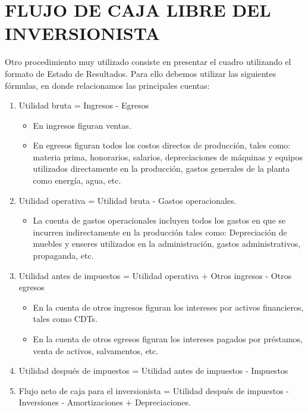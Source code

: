 


\section{FLUJO DE CAJA LIBRE DEL INVERSIONISTA}

Otro procedimiento muy utilizado consiste en presentar el cuadro utilizando el formato de Estado de Resultados. Para ello debemos utilizar las siguientes fórmulas, en donde relacionamos las principales cuentas:\\

\begin{enumerate}
	\item Utilidad bruta = Ingresos - Egresos
	      \begin{itemize}
		      \item En ingresos figuran ventas.
		      \item En egresos figuran todos los costos directos de producción, tales como: materia prima, honorarios, salarios, depreciaciones de máquinas y equipos utilizados directamente en la producción, gastos generales de la planta como energía, agua, etc.\\
	      \end{itemize}
	\item Utilidad operativa = Utilidad bruta - Gastos operacionales.
	      \begin{itemize}
		      \item La cuenta de gastos operacionales incluyen todos los gastos en que se incurren indirectamente en la producción tales como: Depreciación de muebles y enseres utilizados en la administración, gastos administrativos, propaganda, etc.\\
	      \end{itemize}
	\item Utilidad antes de impuestos = Utilidad operativa + Otros ingresos - Otros egresos
	      \begin{itemize}
		      \item En la cuenta de otros ingresos figuran los intereses por activos financieros, tales como CDTs.
		      \item En la cuenta de otros egresos figuran los intereses pagados por préstamos, venta de activos, salvamentos, etc.\\
	      \end{itemize}
	\item Utilidad después de impuestos = Utilidad antes de impuestos - Impuestos\\
	      
	\item Flujo neto de caja para el inversionista = Utilidad después de impuestos - Inversiones - Amortizaciones + Depreciaciones.
\end{enumerate}

